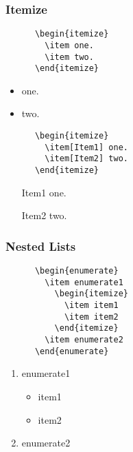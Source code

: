\documentclass{beamer}
\begin{document}
\begin{frame}[fragile]
\frametitle{Itemize} %
  \begin{multicols}{2}
    \begin{verbatim}
      \begin{itemize}
        \item one.
        \item two.
      \end{itemize}
    \end{verbatim}
    \columnbreak
    \begin{itemize}
      \item one.
      \item two.
    \end{itemize}
  \end{multicols}

  \begin{multicols}{2}
    \begin{verbatim}
      \begin{itemize}
        \item[Item1] one.
        \item[Item2] two.
      \end{itemize}
    \end{verbatim}
    \columnbreak
      \begin{itemize}
        \item[Item1] one.
        \item[Item2] two.
      \end{itemize}
  \end{multicols}
\end{frame}

\begin{frame}[fragile]
\frametitle{Nested Lists} %
  \begin{multicols}{2}
    \begin{verbatim}
      \begin{enumerate}
        \item enumerate1
          \begin{itemize}
            \item item1
            \item item2
          \end{itemize}
        \item enumerate2
      \end{enumerate}
    \end{verbatim}
    \columnbreak
      \begin{enumerate}
        \item enumerate1
          \begin{itemize}
            \item item1
            \item item2
          \end{itemize}
        \item enumerate2
      \end{enumerate}
  \end{multicols}
\end{frame}
\end{document}

